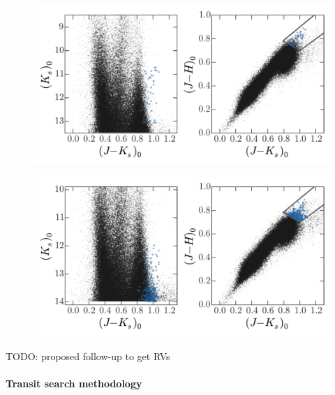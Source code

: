 \documentclass[letterpaper,12pt,preprint]{hack_aastex}
\begin{document}
\begin{figure}[p]
\begin{center}
\includegraphics[width=\textwidth]{fig1.pdf}
\caption{} 
\label{fig:field8}
\end{center}
\end{figure}

\begin{figure}[p]
\begin{center}
\includegraphics[width=\textwidth]{fig2.pdf}
\caption{} 
\label{fig:field10}
\end{center}
\end{figure}

TODO: proposed follow-up to get RVs


\paragraph{Transit search methodology}
\end{document}
